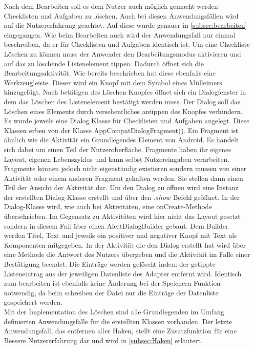 Nach dem Bearbeiten soll es dem Nutzer auch möglich gemacht werden Checklisten und Aufgaben zu löschen. Auch bei diesen Anwendungsfällen wird auf die Nutzererfahrung geachtet. Auf diese wurde genauer in \autoref{subsec:bearbeiten} eingegangen. Wie beim Bearbeiten auch wird der Anwendungsfall nur einmal beschreiben, da er für Checklisten und Aufgaben identisch ist. Um eine Checkliste Löschen zu können muss der Anwender den Bearbeitungsmodus aktivieren und auf das zu löschende Listenelement tippen. Dadurch öffnet sich die Bearbeitungsaktivität. Wie bereits beschrieben hat diese ebenfalls eine Werkzeugleiste. Dieser wird ein Knopf mit dem Symbol eines Mülleimers hinzugefügt. Nach betätigen des Löschen Knopfes öffnet sich ein Dialogfenster in dem das Löschen des Listenelement bestätigt werden muss. Der Dialog soll das Löschen eines Elements durch versehentliches antippen des Knopfes verhindern. Es wurde jeweils eine Dialog Klasse für Checklisten und Aufgaben angelegt. Diese Klassen erben von der Klasse AppCompatDialogFragment(). Ein Fragment ist ähnlich wie die Aktivität ein Grundlegendes Element von Android. Es handelt sich dabei um einen Teil der Nutzeroberfläche. Fragmente haben ihr eigenes Layout, eigenen Lebenszyklus und kann selbst Nutzereingaben verarbeiten. Fragmente können jedoch nicht eigenständig existieren sondern müssen von einer Aktivität oder einem anderen Fragment gehalten werden. Sie stellen dann einen Teil der Ansicht der Aktivität dar. Um den Dialog zu öffnen wird eine Instanz der erstellten Dialog-Klasse erstellt und über den $.show$ Befehl geöffnet. In der Dialog-Klasse wird, wie auch bei Aktivitäten, eine onCreate-Methode überschrieben. Im Gegensatz zu Aktivitäten wird hier nicht das Layout gesetzt sondern in diesem Fall über einen AlertDialogBuilder gebaut. Dem Builder werden Titel, Text und jeweils ein positiver und negativer Knopf mit Text als Komponenten mitgegeben. In der Aktivität die den Dialog erstellt hat wird über eine Methode die Antwort des Nutzers übergeben und die Aktivität im Falle einer Bestätigung beendet. Die Einträge werden gelöscht indem der getippte Listeneintrag aus der jeweiligen Datenliste des Adapter entfernt wird. Identisch zum bearbeiten ist ebenfalls keine Änderung bei der Speichern Funktion notwendig, da beim schreiben der Datei nur die Einträge der Datenliste gespeichert werden.\\
Mit der Implementation des Löschen sind alle Grundlegenden im Umfang definierten Anwendungsfälle für die erstellten Klassen vorhanden. Der letzte Anwendungsfall, das entfernen aller Haken, stellt eine Zusatzfunktion für eine Bessere Nutzererfahrung dar und wird in \autoref{subsec:Haken} erläutert.

